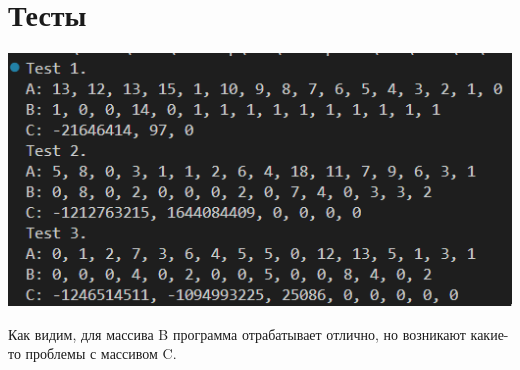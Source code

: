 \documentclass[12pt]{article}
\begin{document}
	\newpage
	
	
	\section*{Тесты}
	
	\includegraphics[width=400pt]{tests.png}
	
	Как видим, для массива B программа отрабатывает отлично, но возникают какие-то проблемы с массивом C.
	
\end{document}
